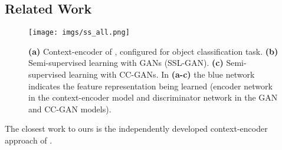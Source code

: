 \documentclass{article} %
\def\etal{{\textit{et~al.~}}}
\begin{document}
\subsection{Related Work}\begin{figure}[t]
\centering
   \texttt{[image: imgs/ss\_all.png]} 
 \caption{ {\bf(a)} Context-encoder of \cite{pathak2016}, configured for object classification task. 
   {\bf(b)} Semi-supervised learning with GANs (SSL-GAN). 
   {\bf(c)} Semi-supervised learning with CC-GANs. In {\bf (a-c)} the blue network indicates the feature representation being learned (encoder network in the context-encoder model and discriminator network in the GAN and CC-GAN models).
}
 \label{fig:semisup}
\end{figure}%
The closest work to ours is the independently
developed context-encoder approach of 
\cite{pathak2016}.
\end{document}
